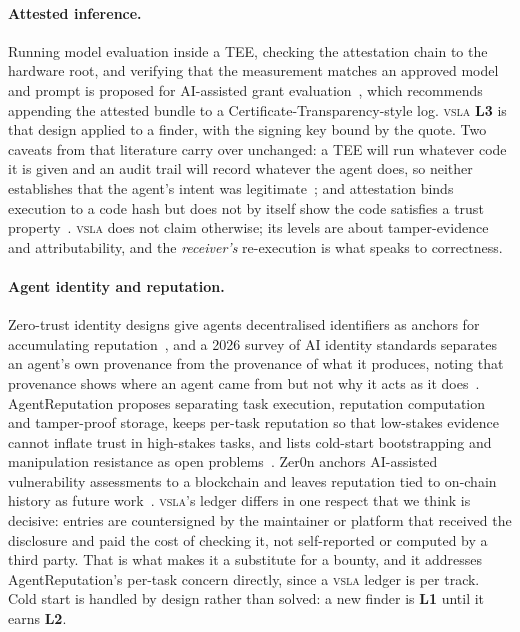 \documentclass[11pt]{article}
\newcommand{\vsla}{\textsc{vsla}}
\newcommand{\lvl}[1]{\textbf{L#1}}
\begin{document}
\paragraph{Attested inference.}
Running model evaluation inside a TEE, checking the attestation chain to the hardware root, and verifying that the
measurement matches an approved model and prompt is proposed for AI-assisted grant evaluation~\cite{teegrant}, which
recommends appending the attested bundle to a Certificate-Transparency-style log. \vsla{} \lvl{3} is that design applied to a finder,
with the signing key bound by the quote. Two caveats from that literature carry over unchanged: a TEE will run
whatever code it is given and an audit trail will record whatever the agent does, so neither establishes that
the agent's intent was legitimate~\cite{aiidentity}; and attestation binds execution to a code hash but does
not by itself show the code satisfies a trust property~\cite{cryptoai}. \vsla{} does not claim otherwise; its
levels are about tamper-evidence and attributability, and the \emph{receiver's} re-execution is what speaks to
correctness.

\paragraph{Agent identity and reputation.}
Zero-trust identity designs give agents decentralised identifiers as anchors for accumulating
reputation~\cite{zerotrustagent}, and a 2026 survey of AI identity standards separates an agent's own
provenance from the provenance of what it produces, noting that provenance shows where an agent came from but
not why it acts as it does~\cite{aiidentity}. AgentReputation proposes separating task execution, reputation
computation and tamper-proof storage, keeps per-task reputation so that low-stakes evidence cannot inflate trust
in high-stakes tasks, and lists cold-start bootstrapping and manipulation resistance as open
problems~\cite{agentreputation}. Zer0n anchors AI-assisted vulnerability assessments to a blockchain and leaves
reputation tied to on-chain history as future work~\cite{zer0n}. \vsla{}'s ledger differs in one respect that we
think is decisive: entries are countersigned by the maintainer or platform that received the disclosure and paid
the cost of checking it, not self-reported or computed by a third party. That is what makes it a substitute for a
bounty, and it addresses AgentReputation's per-task concern directly, since a \vsla{} ledger is per track.
Cold start is handled by design rather than solved: a new finder is \lvl{1} until it earns \lvl{2}.
\end{document}
